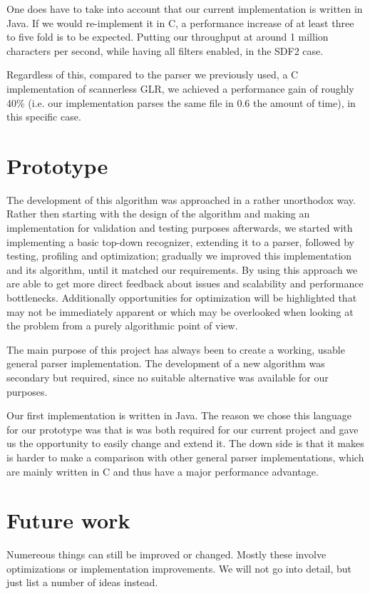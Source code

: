 \documentclass[a4paper,10pt]{article}
\begin{document}
One does have to take into account that our current implementation is written in Java. If we would re-implement it in C, a performance increase of at least three to five fold is to be expected. Putting our throughput at around 1 million characters per second, while having all filters enabled, in the SDF2 case.

Regardless of this, compared to the parser we previously used, a C implementation of scannerless GLR, we achieved a performance gain of roughly 40\% (i.e. our implementation parses the same file in 0.6 the amount of time), in this specific case.

\section{Prototype}

The development of this algorithm was approached in a rather unorthodox way. Rather then starting with the design of the algorithm and making an implementation for validation and testing purposes afterwards, we started with implementing a basic top-down recognizer, extending it to a parser, followed by testing, profiling and optimization; gradually we improved this implementation and its algorithm, until it matched our requirements. By using this approach we are able to get more direct feedback about issues and scalability and performance bottlenecks. Additionally opportunities for optimization will be highlighted that may not be immediately apparent or which may be overlooked when looking at the problem from a purely algorithmic point of view.

The main purpose of this project has always been to create a working, usable general parser implementation. The development of a new algorithm was secondary but required, since no suitable alternative was available for our purposes.

Our first implementation is written in Java. The reason we chose this language for our prototype was that is was both required for our current project and gave us the opportunity to easily change and extend it. The down side is that it makes is harder to make a comparison with other general parser implementations, which are mainly written in C and thus have a major performance advantage.

\section{Future work}

Numereous things can still be improved or changed. Mostly these involve optimizations or implementation improvements. We will not go into detail, but just list a number of ideas instead.
\end{document}
